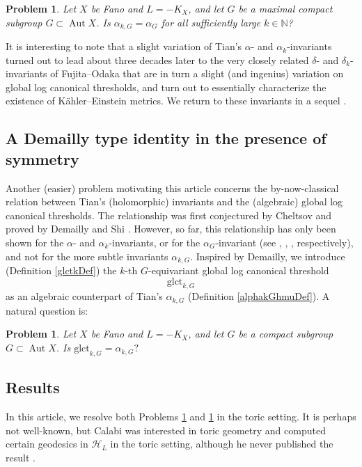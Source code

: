 \documentclass{article}
\newcommand\cH{{\mathcal H}}
\newcommand{\glct}{\mathrm{glct}}
\newcommand{\NN}{{\mathbb N}}
\renewcommand{\>}{\rightarrow}
\DeclareMathOperator{\Aut}{Aut}
\theoremstyle{plain}
\newtheorem{problem}[theorem]{Problem}
\theoremstyle{definition}
\def\KE{K\"ahler--Einstein }
\newcommand{\bprob}{\begin{problem}}
\newcommand{\eprob}{\end{problem}}
\def\lb#1{\label{#1}}
\begin{document}
\bprob
\lb{TianProb}
Let $X$  be Fano and $L=-K_X$, and let $G$
be a maximal compact subgroup $G\subset\Aut X$.
Is $\alpha_{k,G}=\alpha_G$ for all 
sufficiently large $k\in\NN$?
\eprob

It is interesting to note that
a slight variation
of Tian's $\alpha$- and $\alpha_k$-invariants
turned out to lead about three decades
later \cite{Zhang,RTZ} to the very closely
related $\delta$- and $\delta_k$-invariants
of Fujita--Odaka \cite{FO} that
are in turn a slight (and ingenius) variation on global log canonical thresholds,
and turn out to
essentially characterize
the existence of \KE metrics. 
We return to these invariants in a sequel \cite{JR-delta-toric}.

\subsection{A Demailly type identity
in the presence
of symmetry}

Another (easier) problem motivating this article concerns the by-now-classical
relation between Tian's (holomorphic) invariants and 
the (algebraic) global log canonical thresholds. The relationship
was first conjectured by Cheltsov and proved by Demailly and Shi \cite{CS08,Shi10}.
However, so far, this relationship has only been shown for 
the $\alpha$- and $\alpha_k$-invariants, or for the $\alpha_G$-invariant
(see \cite[Theorem A.3]{CS08}, \cite[Proposition 2.1]{Shi10}, \cite[(A.1)]{CS08}, respectively), 
and not for the more subtle invariants $\alpha_{k,G}$.
Inspired by Demailly, we introduce
(Definition \ref{glctkDef})
the $k$-th $G$-equivariant global
log canonical threshold
$$
\glct_{k,G}
$$
as an algebraic counterpart of Tian's
$\alpha_{k,G}$ 
(Definition \ref{alphakGhmuDef}).
A natural question is:

\bprob
\lb{DemaillyProb}
Let $X$  be Fano and $L=-K_X$, and let $G$
be a compact subgroup $G\subset\Aut X$.
Is
$
\glct_{k,G}
=\alpha_{k,G}?
$
\eprob


\subsection{Results}
\lb{ResultsSubSec}

In this article, we resolve both Problems \ref{TianProb} and \ref{DemaillyProb} 
in the toric setting. 
It is perhaps not well-known, but Calabi was interested in toric geometry
and computed certain geodesics in $\cH_L$ in the toric setting, although
he never published the result \cite{Calabi-abstract}.
\end{document}
